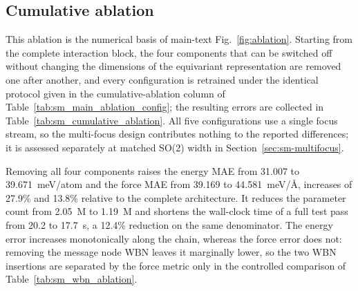 \subsection{Cumulative ablation}
\label{sec:sm-cumulative-ablation}

This ablation is the numerical basis of main-text Fig.~\ref{fig:ablation}.
Starting from the complete interaction block, the four components that can be switched off without changing the dimensions of the equivariant representation are removed one after another, and every configuration is retrained under the identical protocol given in the cumulative-ablation column of Table~\ref{tab:sm_main_ablation_config}; the resulting errors are collected in Table~\ref{tab:sm_cumulative_ablation}.
All five configurations use a single focus stream, so the multi-focus design contributes nothing to the reported differences; it is assessed separately at matched SO(2) width in Section~\ref{sec:sm-multifocus}.

Removing all four components raises the energy MAE from 31.007 to 39.671~meV/atom and the force MAE from 39.169 to 44.581~meV/\AA{}, increases of 27.9\% and 13.8\% relative to the complete architecture.
It reduces the parameter count from 2.05~M to 1.19~M and shortens the wall-clock time of a full test pass from 20.2 to 17.7~s, a 12.4\% reduction on the same denominator.
The energy error increases monotonically along the chain, whereas the force error does not: removing the message node WBN leaves it marginally lower, so the two WBN insertions are separated by the force metric only in the controlled comparison of Table~\ref{tab:sm_wbn_ablation}.

